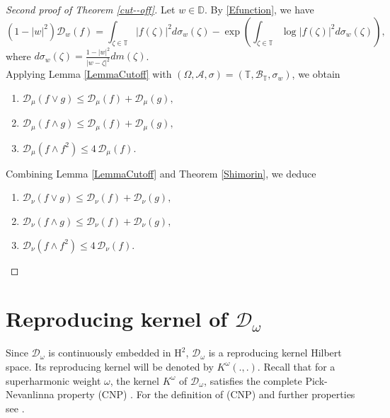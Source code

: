 \documentclass[12pt,reqno,a4paper]{amsart}
\newcommand{\cA}{{\mathcal{A}}}
\newcommand\TT{\mathbb{T}}
\newcommand{\cD}{{\mathcal{D}}}
\numberwithin{equation}{section}
\begin{document}
\begin{proof}[Second proof of Theorem \ref{cut--off}]
	Let \(w \in \mathbb{D}\). By \eqref{Efunction}, we have  
	\[
	(1-|w|^2)\mathcal{D}_{w}(f) = \int_{\zeta \in \mathbb{T}} |f(\zeta)|^2 d\sigma_w(\zeta) 
	- \exp\left(\int_{\zeta \in \mathbb{T}} \log|f(\zeta)|^2 d\sigma_w(\zeta)\right),
	\] 
	where \(d\sigma_{w}(\zeta) = \frac{1 - |w|^2}{|w - \zeta|^2} dm(\zeta)\). \\
	Applying Lemma \ref{LemmaCutoff} with \((\Omega, \cA, \sigma) = (\mathbb{T}, \mathcal{B} _\TT, \sigma_{w})\), we obtain 
	\begin{enumerate}
		\item[A.] $\cD_{\mu}(f\vee g)\leq \cD_{\mu}(f)+\cD_{\mu}(g),$
		\item[B.] $\cD_{\mu}(f\wedge g) \leq \cD_{\mu}(f)+\cD_{\mu}(g),$
		\item[C.] $\cD_{\mu}(f\wedge f^2)\leq 4 \, \cD_{\mu}(f)$.
	\end{enumerate}
	Combining Lemma \ref{LemmaCutoff} and Theorem \ref{Shimorin}, we deduce
	\begin{enumerate}
		\item[A.] $\cD_{\nu}(f\vee g)\leq \cD_{\nu}(f)+{\cD_{\nu}(g)},$
		\item[B.] $\cD_{\nu}(f\wedge g) \leq \cD_{\nu}(f)+\cD_{\nu}(g),$
		\item[C.] $\cD_{\nu}(f\wedge f^2)\leq 4 \, \cD_{\nu}(f)$.
	\end{enumerate}
\end{proof}
\section{Reproducing kernel of $\cD_\omega$}

Since $\cD_\omega$ is continuously embedded in $\mathrm{H}^2$, $\cD _\omega$ is a reproducing kernel Hilbert space. Its reproducing kernel will be denoted by $K^\omega (.,.)$. Recall that for a superharmonic weight $\omega$, the kernel $K^{\omega}$ of $\cD_\omega$, satisfies the complete Pick-Nevanlinna property (CNP) \cite{Shi2}. For the definition of (CNP) and further properties see \cite{AM, AHMR1, H} .\\
\end{document}
